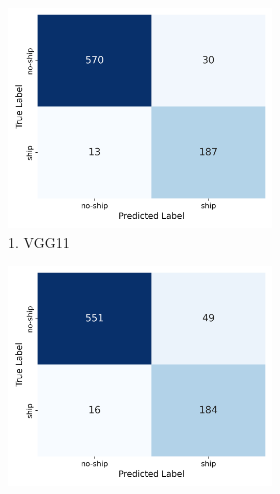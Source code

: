 \documentclass[11pt]{article}
\begin{document}
\begin{figure}[H]
		\begin{subfigure}[b]{\textwidth}
			\centering
			\begin{subfigure}[b]{0.32\textwidth}
				\centering
				\captionsetup{labelformat=empty}
				\includegraphics[width=\textwidth]{assets/confusion_matrix/vgg11_confusion_matrix.png}
				\caption*{1. VGG11}
			\end{subfigure}
			\hfill
			\begin{subfigure}[b]{0.32\textwidth}
				\centering
				\captionsetup{labelformat=empty}
				\includegraphics[width=\textwidth]{assets/confusion_matrix/resnet50_confusion_matrix.png}

\end{subfigure}
\end{subfigure}
\end{figure}
\end{document}
